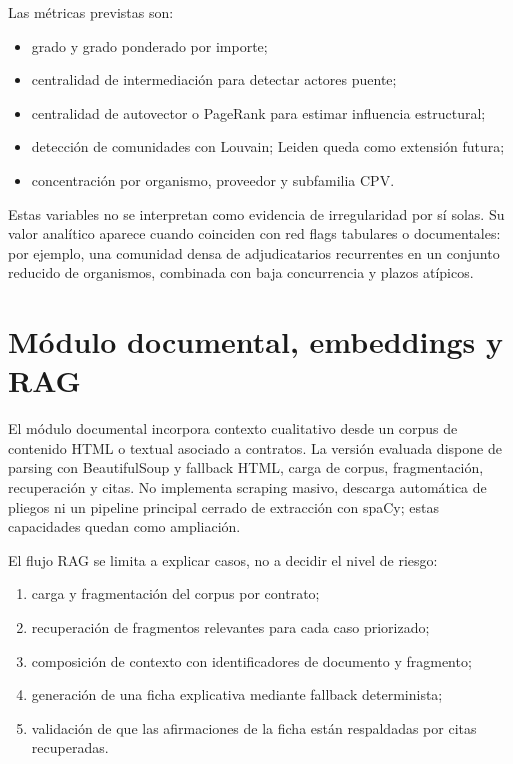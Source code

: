 \documentclass[11pt,a4paper,spanish]{book}
\numberwithin{equation}{chapter}
\numberwithin{figure}{chapter}
\begin{document}
Las m{\'e}tricas previstas son:

\begin{itemize}
  \item grado y grado ponderado por importe;
  \item centralidad de intermediaci{\'o}n para detectar actores puente;
  \item centralidad de autovector o PageRank para estimar influencia estructural;
  \item detecci{\'o}n de comunidades con Louvain; Leiden queda como extensi{\'o}n futura;
  \item concentraci{\'o}n por organismo, proveedor y subfamilia CPV.
\end{itemize}

Estas variables no se interpretan como evidencia de irregularidad por s{\'i} solas. Su valor anal{\'i}tico aparece cuando coinciden con red flags tabulares o documentales: por ejemplo, una comunidad densa de adjudicatarios recurrentes en un conjunto reducido de organismos, combinada con baja concurrencia y plazos at{\'i}picos.

\section{M{\'o}dulo documental, embeddings y RAG}
\label{sec:rag_cap6}

El m{\'o}dulo documental incorpora contexto cualitativo desde un corpus de contenido HTML o textual asociado a contratos. La versi{\'o}n evaluada dispone de parsing con BeautifulSoup y fallback HTML, carga de corpus, fragmentaci{\'o}n, recuperaci{\'o}n y citas. No implementa scraping masivo, descarga autom{\'a}tica de pliegos ni un pipeline principal cerrado de extracci{\'o}n con spaCy; estas capacidades quedan como ampliaci{\'o}n.

El flujo RAG se limita a explicar casos, no a decidir el nivel de riesgo:

\begin{enumerate}
  \item carga y fragmentaci{\'o}n del corpus por contrato;
  \item recuperaci{\'o}n de fragmentos relevantes para cada caso priorizado;
  \item composici{\'o}n de contexto con identificadores de documento y fragmento;
  \item generaci{\'o}n de una ficha explicativa mediante fallback determinista;
  \item validaci{\'o}n de que las afirmaciones de la ficha est{\'a}n respaldadas por citas recuperadas.
\end{enumerate}
\end{document}
